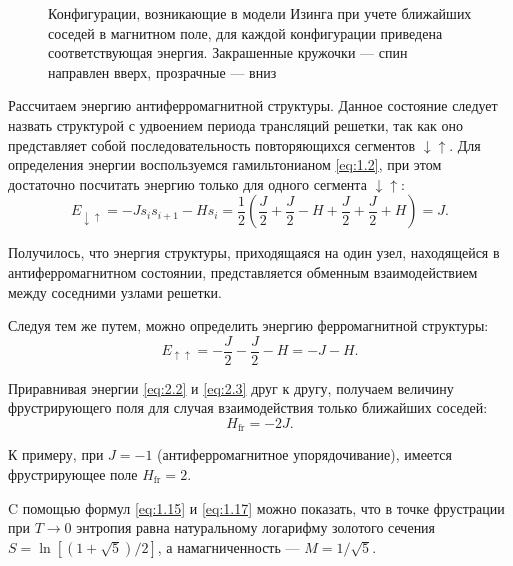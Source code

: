  \begin{figure}[h]
 	\caption{Конфигурации, возникающие в модели Изинга при учете ближайших соседей в магнитном поле, для каждой конфигурации приведена соответствующая энергия. Закрашенные кружочки --- спин направлен вверх, прозрачные --- вниз}
 	\label{antiferro}
 \end{figure}

Рассчитаем энергию антиферромагнитной структуры. Данное состояние следует назвать структурой с удвоением периода трансляций решетки, так как оно представляет собой последовательность повторяющихся сегментов $\downarrow \uparrow$. Для определения энергии воспользуемся гамильтонианом \eqref{eq:1.2}, при этом достаточно посчитать энергию только для одного сегмента $\downarrow \uparrow$:
\begin{equation}
E_{\downarrow \uparrow}=-J s_{i}s_{i+1}-H s_{i} =\frac{1}{2}\left( \frac{J}{2}+\frac{J}{2}-H+\frac{J}{2}+\frac{J}{2}+H\right)=J.
\label{eq:2.2}
\end{equation}

Получилось, что энергия структуры, приходящаяся на один узел, находящейся в антиферромагнитном состоянии, представляется обменным взаимодействием между соседними узлами решетки.

Следуя тем же путем, можно определить энергию ферромагнитной структуры:
\begin{equation}
E_{\uparrow \uparrow} = -\frac{J}{2}-\frac{J}{2}-H= -J-H.
\label{eq:2.3}
\end{equation}

Приравнивая энергии \eqref{eq:2.2} и \eqref{eq:2.3} друг к другу, получаем величину фрустрирующего поля для случая взаимодействия только ближайших соседей:
\begin{equation}
H_{\text{fr}}=-2J.
\label{eq:2.4}
\end{equation}

К примеру, при $J=-1$ (антиферромагнитное упорядочивание), имеется фрустрирующее поле $H_{\text{fr}}=2$.

C помощью формул \eqref{eq:1.15} и \eqref{eq:1.17} можно показать, что в точке фрустрации при $T\rightarrow 0$ энтропия равна натуральному логарифму золотого сечения $S=\ln \left[\left(1+\sqrt{5}\right)\!/2\right]$, а намагниченность --- $M=1/\sqrt{5}$.

